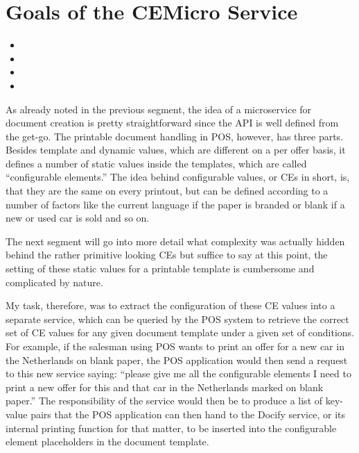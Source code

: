 \section{Goals of the CEMicro Service}

\begin{itemize}
  \item {}
  \item {}
  \item {}
  \item {}
\end{itemize}


As already noted in the previous segment, the idea of a microservice for document creation is pretty straightforward since the API is well defined from the get-go. The printable document handling in POS, however, has three parts. Besides template and dynamic values, which are different on a per offer basis, it defines a number of static values inside the templates, which are called ``configurable elements.'' The idea behind configurable values, or CEs in short, is, that they are the same on every printout, but can be defined according to a number of factors like the current language if the paper is branded or blank if a new or used car is sold and so on.

The next segment will go into more detail what complexity was actually hidden behind the rather primitive looking CEs but suffice to say at this point, the setting of these static values for a printable template is cumbersome and complicated by nature.

My task, therefore, was to extract the configuration of these CE values into a separate service, which can be queried by the POS system to retrieve the correct set of CE values for any given document template under a given set of conditions. For example, if the salesman using POS wants to print an offer for a new car in the Netherlands on blank paper, the POS application would then send a request to this new service saying: ``please give me all the configurable elements I need to print a new offer for this and that car in the Netherlands marked on blank paper.'' The responsibility of the service would then be to produce a list of key-value pairs that the POS application can then hand to the Docify service, or its internal printing function for that matter, to be inserted into the configurable element placeholders in the document template.

